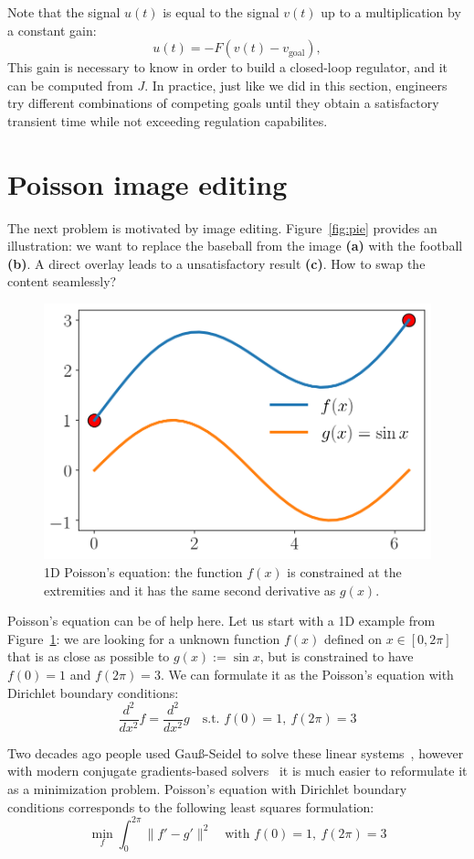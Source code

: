 \documentclass[notitlepage,oneside]{book}
\begin{document}

Note that the signal $u(t)$ is equal to the signal $v(t)$ up to a multiplication by a constant gain:
$$
u(t) = -F (v(t) - v_{\text{goal}}),
$$
This gain is necessary to know in order to build a closed-loop regulator, and it can be computed from $J$.
In practice, just like we did in this section,
engineers try different combinations of competing goals until they obtain a satisfactory transient time while not exceeding regulation capabilites.






\section{Poisson image editing}
\label{sec:poisson}
The next problem is motivated by image editing.
Figure~\ref{fig:pie} provides an illustration:
we want to replace the baseball from the image \textbf{(a)} with the football \textbf{(b)}. A direct overlay leads to a unsatisfactory result \textbf{(c)}.
How to swap the content seamlessly?

\begin{figure}[tb]
    \centering
    \includegraphics[width=.34\linewidth]{pie-1d.png}
    \caption{1D Poisson's equation: the function $f(x)$ is constrained at the extremities and it has the same second derivative as $g(x)$.}
    \label{fig:pie1d}
\end{figure}

Poisson's equation can be of help here. Let us start with a 1D example from Figure~\ref{fig:pie1d}: we are looking for a unknown function $f(x)$ defined on $x\in[0,2\pi]$ that is as close as possible to $g(x):=\sin x$, but is constrained to have $f(0)=1$ and $f(2\pi) = 3$.
We can formulate it as the Poisson's equation with Dirichlet boundary conditions:
$$
\frac{d^2}{dx^2}f  = \frac{d^2}{dx^2} g \quad \text{s.t.~} f(0)=1,~f(2\pi) = 3
$$

Two decades ago people used Gauß-Seidel to solve these linear systems~\cite{10.1145/882262.882269},
however with modern conjugate gradients-based solvers~\cite{OpenNL} it is much easier to reformulate it as a minimization problem.
Poisson's equation with Dirichlet boundary conditions corresponds to the following least squares formulation:
$$
\min\limits_{f} \int_0^{2\pi} \|f' - g'\|^2 \quad \text{with~} f(0)=1,~f(2\pi) = 3
$$
\end{document}
